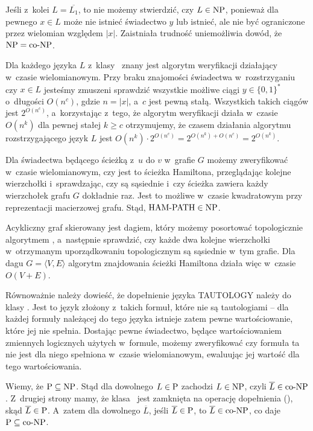 Jeśli z~kolei $L=\overline{L_1}$, to nie możemy stwierdzić, czy $L\in\text{NP}$, ponieważ dla pewnego $x\in L$ może nie istnieć świadectwo $y$ lub istnieć, ale nie być ograniczone przez wielomian względem $|x|$.
Zaistniała trudność uniemożliwia dowód, że $\text{NP}=\text{co-NP}$.

\exercise %
Dla każdego języka $L$ z~klasy \NPclass\ znany jest algorytm weryfikacji działający w~czasie wielomianowym.
Przy braku znajomości świadectwa w~rozstrzyganiu czy $x\in L$ jesteśmy zmuszeni sprawdzić wszystkie możliwe ciągi $y\in\{0,1\}^*$ o~długości $O(n^c)$, gdzie $n=|x|$, a~$c$ jest pewną stałą.
Wszystkich takich ciągów jest $2^{O(n^c)}$, a~korzystając z~tego, że algorytm weryfikacji działa w~czasie $O(n^k)$ dla pewnej stałej $k\ge c$ otrzymujemy, że czasem działania algorytmu rozstrzygającego język $L$ jest $O(n^k)\cdot2^{O(n^c)}=2^{O(n^k)+O(n^c)}=2^{O(n^k)}$.

\exercise %
Dla świadectwa będącego ścieżką z~$u$ do $v$ w~grafie $G$ możemy zweryfikować w~czasie wielomianowym, czy jest to ścieżka Hamiltona, przeglądając kolejne wierzchołki i~sprawdzając, czy są sąsiednie i~czy ścieżka zawiera każdy wierzchołek grafu $G$ dokładnie raz.
Jest to możliwe w~czasie kwadratowym przy reprezentacji macierzowej grafu.
Stąd, $\text{HAM-PATH}\in\text{NP}$.

\exercise %
Acykliczny graf skierowany jest dagiem, który możemy posortować topologicznie algorytmem , a~następnie sprawdzić, czy każde dwa kolejne wierzchołki w~otrzymanym uporządkowaniu topologicznym są sąsiednie w~tym grafie.
Dla dagu $G=\langle V,E\rangle$ algorytm znajdowania ścieżki Hamiltona działa więc w~czasie $O(V+E)$.

\exercise %
Równoważnie należy dowieść, że dopełnienie języka TAUTOLOGY należy do klasy \NPclass.
Jest to język złożony z~takich formuł, które nie są tautologiami -- dla każdej formuły należącej do tego języka istnieje zatem pewne wartościowanie, które jej nie spełnia.
Dostając pewne świadectwo, będące wartościowaniem zmiennych logicznych użytych w~formule, możemy zweryfikować czy formuła ta nie jest dla niego spełniona w~czasie wielomianowym, ewaluując jej wartość dla tego wartościowania.

\exercise %
Wiemy, że $\text{P}\subseteq\text{NP}$.
Stąd dla dowolnego $L\in\text{P}$ zachodzi $L\in\text{NP}$, czyli $\overline{L}\in\text{co-NP}$.
Z~drugiej strony mamy, że klasa \Pclass\ jest zamknięta na operację dopełnienia (), skąd $\overline{L}\in\text{P}$.
A~zatem dla dowolnego $\overline{L}$, jeśli $\overline{L}\in\text{P}$, to $\overline{L}\in\text{co-NP}$, co daje $\text{P}\subseteq\text{co-NP}$.

